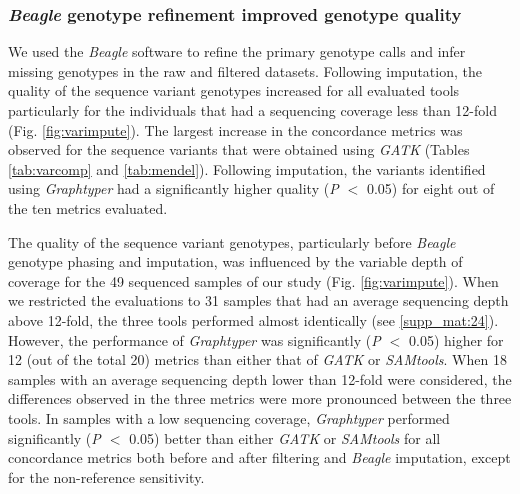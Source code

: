 \documentclass[../main.tex]{subfiles}
\begin{document}
\subsubsection*{\emph{Beagle} genotype refinement improved genotype quality}

We used the \emph{Beagle} software to refine the primary genotype calls and infer missing genotypes in the raw and filtered datasets. 
Following imputation, the quality of the sequence variant genotypes increased for all evaluated tools particularly for the individuals that had a sequencing coverage less than 12-fold (Fig. \ref{fig:varimpute}). 
The largest increase in the concordance metrics was observed for the sequence variants that were obtained using \emph{GATK} (Tables \ref{tab:varcomp} and \ref{tab:mendel}). 
Following imputation, the variants identified using \emph{Graphtyper} had a significantly higher quality (\emph{P $<$} 0.05) for eight out of the ten metrics evaluated.

The quality of the sequence variant genotypes, particularly before \emph{Beagle} genotype phasing and imputation, was influenced by the variable depth of coverage for the 49 sequenced samples of our study (Fig. \ref{fig:varimpute}). 
When we restricted the evaluations to 31 samples that had an average sequencing depth above 12-fold, the three tools performed almost identically (see \ref{supp_mat:24}). 
However, the performance of \emph{Graphtyper} was significantly (\emph{P $<$} 0.05) higher for 12 (out of the total 20) metrics than either that of \emph{GATK} or \emph{SAMtools}. 
When 18 samples with an average sequencing depth lower than 12-fold were considered, the differences observed in the three metrics were more pronounced between the three tools. 
In samples with a low sequencing coverage, \emph{Graphtyper} performed significantly (\emph{P $<$} 0.05) better than either \emph{GATK} or \emph{SAMtools} for all concordance metrics both before and after filtering and \emph{Beagle} imputation, except for the non-reference sensitivity.
\end{document}
